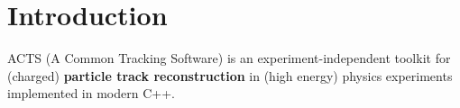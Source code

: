 \section{Introduction}
ACTS (A Common Tracking Software) is an experiment-independent toolkit for (charged) \textbf{particle track reconstruction} in (high energy) physics experiments implemented in modern C++.

